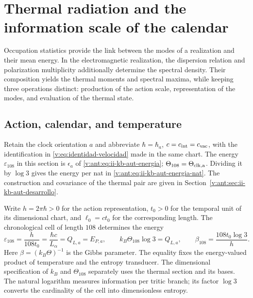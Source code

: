 \section{Thermal radiation and the information scale of the calendar}
\label{v:sec:radiacion-termica}

Occupation statistics provide the link between the modes of
a realization and their mean energy. In the electromagnetic realization,
the dispersion relation and polarization multiplicity additionally determine the
spectral density. Their composition yields the thermal moments
and spectral maxima, while keeping three operations distinct:
production of the action scale, representation of the modes, and
evaluation of the thermal state.

\subsection{Action, calendar, and temperature}

Retain the clock orientation \(a\) and abbreviate
\(\hbar=\hbar_a\), \(c=c_{\rm int}=c_{\rm vac}\), with the
identification in \eqref{v:eq:identidad-velocidad} made in the same chart.
The energy \(\varepsilon_{108}\) in this section is
\(\epsilon_a\) of \eqref{v:ant:eq:ii-kb-aut-energia};
\(\Theta_{108}=\Theta_{\rm clk,a}\). Dividing it by \(\log3\)
gives the energy per nat in \eqref{v:ant:eq:ii-kb-aut-energia-nat}.
The construction and covariance of the thermal pair are given in
Section~\ref{v:ant:sec:ii-kb-aut-desarrollo}.

Write \(h=2\pi\hbar>0\) for the action representation, \(t_0>0\)
for the temporal unit of its dimensional chart, and \(\ell_0=ct_0\) for
the corresponding length. The chronological cell of length \(108\)
determines the energy
\begin{equation}
 \varepsilon_{108}=\frac{h}{108t_0}
 =\frac{\hbar c}{L_\alpha}=Q_{L,a}=E_{P,a},\qquad
 k_B\Theta_{108}\log 3=Q_{L,a},\qquad
 \beta_{108}=\frac{108t_0\log3}{h}.
 \label{v:eq:energia-informacion-calendario}
\end{equation}
Here \(\beta=(k_B\Theta)^{-1}\) is the Gibbs parameter. The equality
fixes the energy-valued product of temperature and the entropy
transducer. The dimensional specification of \(k_B\) and
\(\Theta_{108}\) separately uses the thermal section and its bases. The natural
logarithm measures information per tritic branch; its factor \(\log3\) converts
the cardinality of the cell into dimensionless entropy.

